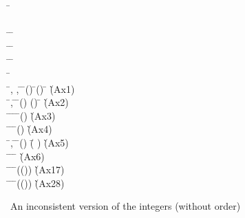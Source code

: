 \begin{figure}[!ht]
\begin{hetcasl}
\SPEC \= \Ax{=}\\
\> \SORT {}\\
\> \OP \=\Ax{\_\_}\Ax{+}\Ax{\_\_} \Ax{:} \= \Ax{\times}  \Ax{\rightarrow} \\
\> \OP \= \Ax{:} \= \Ax{\rightarrow} \\
\> \OP \= \Ax{:} \= \Ax{\rightarrow} \\
\> \OP \= \Ax{:} \\
\> \Ax{\forall} \=, ,  \Ax{:}  \=\Ax{\bullet} \=() \Ax{=}  \Ax{\wedge} \=() \Ax{=}  \Ax{\Rightarrow} \= \Ax{=}  \`{\small{}\KW{\%}(Ax1)\KW{\%}}\\
\> \Ax{\forall} \=,  \Ax{:}  \=\Ax{\bullet} \=() \Ax{=} () \Ax{\Rightarrow} \= \Ax{=}  \`{\small{}\KW{\%}(Ax2)\KW{\%}}\\
\> \Ax{\forall} \= \Ax{:}  \=\Ax{\bullet} \=\Ax{\exists}  \Ax{:}  \Ax{\bullet} \=() \Ax{=}  \`{\small{}\KW{\%}(Ax3)\KW{\%}}\\
\> \Ax{\forall} \= \Ax{:}  \=\Ax{\bullet} \Ax{\neg} \=() \Ax{=}  \`{\small{}\KW{\%}(Ax4)\KW{\%}}\\
\> \Ax{\forall} \=,  \Ax{:}  \=\Ax{\bullet} \=() \Ax{+}  \Ax{=} (\= \Ax{+} ) \`{\small{}\KW{\%}(Ax5)\KW{\%}}\\
\> \Ax{\forall} \= \Ax{:}  \=\Ax{\bullet} \= \Ax{+}  \Ax{=}  \`{\small{}\KW{\%}(Ax6)\KW{\%}}\\
\> \Ax{\forall} \= \Ax{:}  \=\Ax{\bullet} \=(()) \Ax{=}  \`{\small{}\KW{\%}(Ax1\Ax{\_}7)\KW{\%}}\\
\> \Ax{\forall} \= \Ax{:}  \=\Ax{\bullet}
\=(()) \Ax{=} 
\`{\small{}\KW{\%}(Ax2\Ax{\_}8)\KW{\%}}
\end{hetcasl}
\caption{An inconsistent version of the integers (without order)}
\label{fig:inconsistentintegers}
\end{figure}


